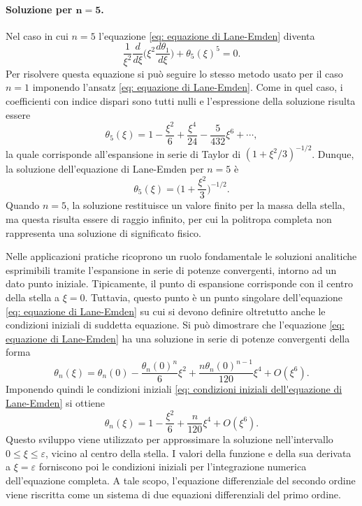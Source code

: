 \documentclass{article}
\numberwithin{equation}{section}
\begin{document}
\paragraph{Soluzione per $\bm{n = 5}$.} Nel caso in cui $n = 5$ l'equazione \eqref{eq: equazione di Lane-Emden} diventa
\begin{equation}
    \frac{1}{\xi^2}\frac{d}{d\xi}\bigg(\xi^2\frac{d\theta_1}{d\xi}\bigg) + \theta_5(\xi)^5 = 0.
\end{equation}
Per risolvere questa equazione si può seguire lo stesso metodo usato per il caso $n = 1$ imponendo l'ansatz \eqref{eq: equazione di Lane-Emden}. Come in quel caso, i coefficienti con indice dispari sono tutti nulli e l'espressione della soluzione risulta essere
\begin{equation}
    \theta_5(\xi) = 1 - \frac{\xi^2}{6} + \frac{\xi^4}{24} - \frac{5}{432}\xi^6 + \cdots,
\end{equation}
la quale corrisponde all'espansione in serie di Taylor di $(1 + \xi^2/3)^{-1/2}$. Dunque, la soluzione dell'equazione di Lane-Emden per $n=5$ è
\begin{equation}
\label{eq: soluzione analitica per n = 5}
    \theta_5(\xi) = \bigg(1 + \frac{\xi^2}{3}\bigg)^{-1/2}.
\end{equation}
Quando $n = 5$, la soluzione restituisce un valore finito per la massa della stella, ma questa risulta essere di raggio infinito, per cui la politropa completa non rappresenta una soluzione di significato fisico. 
\bigskip

Nelle applicazioni pratiche ricoprono un ruolo fondamentale le soluzioni analitiche esprimibili tramite l'espansione in serie di potenze convergenti, intorno ad un dato punto iniziale. Tipicamente, il punto di espansione corrisponde con il centro della stella a $\xi = 0$. Tuttavia, questo punto è un punto singolare dell'equazione \eqref{eq: equazione di Lane-Emden} su cui si devono definire oltretutto anche le condizioni iniziali di suddetta equazione. Si può dimostrare che l'equazione \eqref{eq: equazione di Lane-Emden} ha una soluzione in serie di potenze convergenti della forma 
\begin{equation}
    \theta_n(\xi) = \theta_n(0) - \frac{\theta_n(0)^n}{6}\xi^2 + \frac{n\theta_n(0)^{n - 1}}{120}\xi^4 + O(\xi^6).
\end{equation}
Imponendo quindi le condizioni iniziali \eqref{eq: condizioni iniziali dell'equazione di Lane-Emden} si ottiene
\begin{equation}
\label{eq: sviluppo intorno all'origine}
    \theta_n(\xi) = 1 - \frac{\xi^2}{6} + \frac{n}{120}\xi^4 + O(\xi^6).
\end{equation}
Questo sviluppo viene utilizzato per approssimare la soluzione nell'intervallo $0 \leq \xi \leq \varepsilon$, vicino al centro della stella. I valori della funzione e della sua derivata a $\xi = \varepsilon$ forniscono poi le condizioni iniziali per l'integrazione numerica dell'equazione completa. A tale scopo, l'equazione differenziale del secondo ordine viene riscritta come un sistema di due equazioni differenziali del primo ordine.
\end{document}
